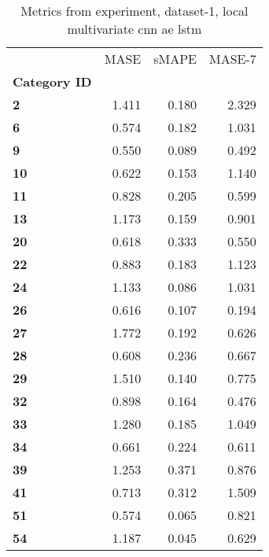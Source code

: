 \begin{table}[h]
\centering
\caption{Metrics from experiment, dataset-1, local multivariate cnn ae lstm}
\label{table:local-multivariate-cnn-ae-lstm-dataset-1}
\begin{tabular}{lrrr}
\toprule
{} &   MASE &  sMAPE &  MASE-7 \\
\textbf{Category ID} &        &        &         \\
\midrule
\textbf{2          } &  1.411 &  0.180 &   2.329 \\
\textbf{6          } &  0.574 &  0.182 &   1.031 \\
\textbf{9          } &  0.550 &  0.089 &   0.492 \\
\textbf{10         } &  0.622 &  0.153 &   1.140 \\
\textbf{11         } &  0.828 &  0.205 &   0.599 \\
\textbf{13         } &  1.173 &  0.159 &   0.901 \\
\textbf{20         } &  0.618 &  0.333 &   0.550 \\
\textbf{22         } &  0.883 &  0.183 &   1.123 \\
\textbf{24         } &  1.133 &  0.086 &   1.031 \\
\textbf{26         } &  0.616 &  0.107 &   0.194 \\
\textbf{27         } &  1.772 &  0.192 &   0.626 \\
\textbf{28         } &  0.608 &  0.236 &   0.667 \\
\textbf{29         } &  1.510 &  0.140 &   0.775 \\
\textbf{32         } &  0.898 &  0.164 &   0.476 \\
\textbf{33         } &  1.280 &  0.185 &   1.049 \\
\textbf{34         } &  0.661 &  0.224 &   0.611 \\
\textbf{39         } &  1.253 &  0.371 &   0.876 \\
\textbf{41         } &  0.713 &  0.312 &   1.509 \\
\textbf{51         } &  0.574 &  0.065 &   0.821 \\
\textbf{54         } &  1.187 &  0.045 &   0.629 \\
\bottomrule
\end{tabular}
\end{table}
